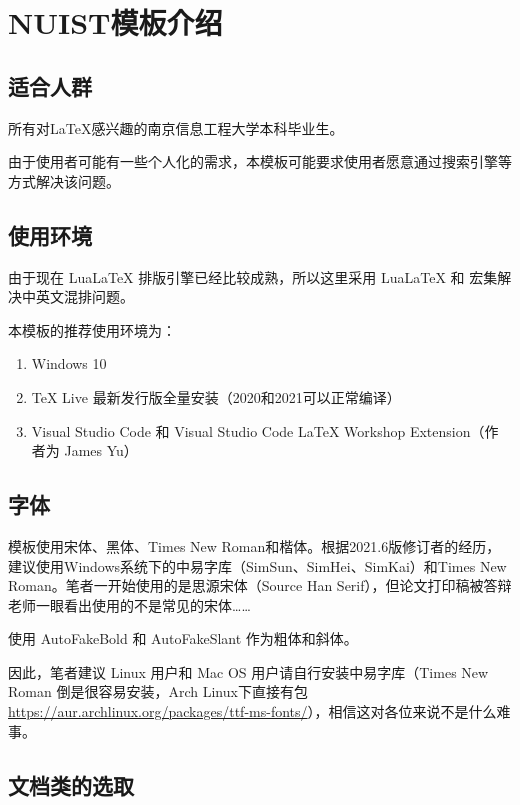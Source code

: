 \section{NUIST模板介绍}

\subsection{适合人群}

所有对\LaTeX 感兴趣的南京信息工程大学本科毕业生。

由于使用者可能有一些个人化的需求，本模板可能要求使用者愿意通过搜索引擎等方式解决该问题。

\subsection{使用环境}

由于现在 LuaLaTeX 排版引擎已经比较成熟，所以这里采用 LuaLaTeX 和 \CTeX{} 宏集解决中英文混排问题。

本模板的推荐使用环境为：

\begin{enumerate}[1、]
    \item Windows 10
    \item TeX Live 最新发行版全量安装（2020和2021可以正常编译）
    \item Visual Studio Code 和 Visual Studio Code LaTeX Workshop Extension（作者为 James Yu）
\end{enumerate}

\subsection{字体}

模板使用宋体、黑体、Times New Roman和楷体。根据2021.6版修订者的经历，建议使用Windows系统下的中易字库（SimSun、SimHei、SimKai）和Times New Roman。笔者一开始使用的是思源宋体（Source Han Serif），但论文打印稿被答辩老师一眼看出使用的不是常见的宋体……

使用 AutoFakeBold 和 AutoFakeSlant 作为粗体和斜体。

因此，笔者建议 Linux 用户和 Mac OS 用户请自行安装中易字库（Times New Roman 倒是很容易安装，Arch Linux下直接有包 \url{https://aur.archlinux.org/packages/ttf-ms-fonts/}），相信这对各位来说不是什么难事。

\subsection{文档类的选取}

